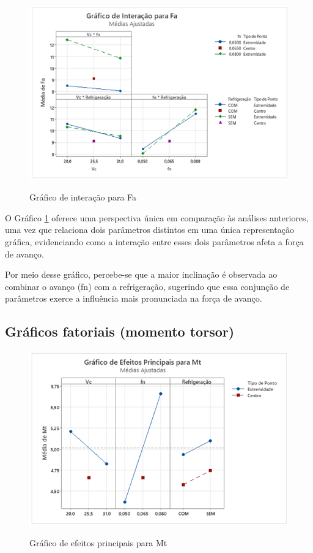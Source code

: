 \documentclass[deposito, acronym, symbols]{fei}
\begin{document}
 \begin{figure}[!htp]
    \centering
    \caption{Gráfico de interação para Fa}
    \includegraphics[width=0.8\linewidth]{Imagens/interação1.png}
    \label{fig:int1}
\end{figure}

O Gráfico \ref{fig:int1} oferece uma perspectiva única em comparação às análises anteriores, uma vez que relaciona dois parâmetros distintos em uma única representação gráfica, evidenciando como a interação entre esses dois parâmetros afeta a força de avanço.
 
Por meio desse gráfico, percebe-se que a maior inclinação é observada ao combinar o avanço (fn) com a refrigeração, sugerindo que essa conjunção de parâmetros exerce a influência mais pronunciada na força de avanço.

\newpage
\subsection{Gráficos fatoriais (momento torsor)}

 \begin{figure}[!htp]
    \centering
    \caption{Gráfico de efeitos principais para Mt}
    \includegraphics[width=0.8\linewidth]{Imagens/efeitos2.png}
    \label{fig:efe2}
\end{figure}
\end{document}
